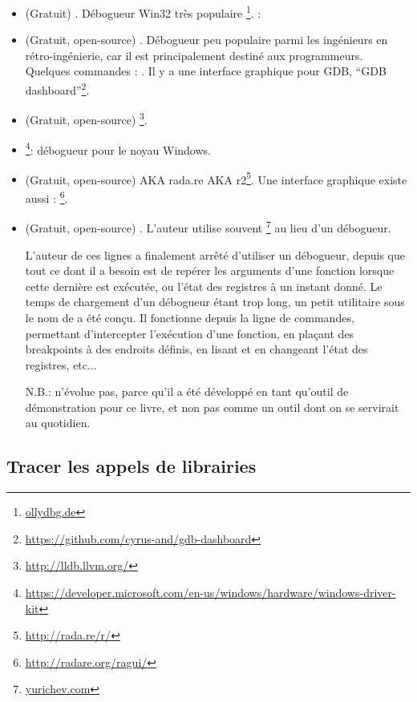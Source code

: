 \begin{itemize}
\item (Gratuit) .
Débogueur Win32 très populaire \footnote{\href{http://go.yurichev.com/17032}{ollydbg.de}}.
\ShortHotKeyCheatsheet: 

\item (Gratuit, open-source) .
Débogueur peu populaire parmi les ingénieurs en rétro-ingénierie, car il est principalement destiné aux programmeurs.
Quelques commandes : .
Il y a une interface graphique pour GDB, ``GDB dashboard''\footnote{\url{https://github.com/cyrus-and/gdb-dashboard}}.

\item (Gratuit, open-source) \footnote{\url{http://lldb.llvm.org/}}.

\item {}\footnote{\url{https://developer.microsoft.com/en-us/windows/hardware/windows-driver-kit}}:
débogueur pour le noyau Windows.

\item (Gratuit, open-source)  \ac{AKA} rada.re \ac{AKA} r2\footnote{\url{http://rada.re/r/}}.
Une interface graphique existe aussi : \footnote{\url{http://radare.org/ragui/}}.

\item (Gratuit, open-source) .
\label{tracer}
L'auteur utilise souvent 
\footnote{\href{http://go.yurichev.com/17338}{yurichev.com}}
au lieu d'un débogueur.

L'auteur de ces lignes a finalement arrêté d'utiliser un débogueur, depuis que tout ce dont il a besoin est de repérer les arguments d'une fonction lorsque cette dernière est exécutée, ou l'état des registres à un instant donné.
Le temps de chargement d'un débogueur étant trop long, un petit utilitaire sous le nom de  a été conçu.
Il fonctionne depuis la ligne de commandes, permettant d'intercepter l'exécution d'une fonction,
en plaçant des breakpoints à des endroits définis, en lisant et en changeant l'état des registres, etc...

N.B.:  n'évolue pas, parce qu'il a été développé en tant qu'outil de démonstration pour ce livre, et non pas comme un outil dont on se servirait au quotidien.
\end{itemize}

\subsection{Tracer les appels de librairies}

